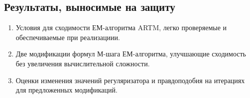 \documentclass[12pt]{article}
\begin{document}
\subsection{Результаты, выносимые на защиту}
\begin{enumerate}
\item Условия для сходимости ЕМ-алгоритма ARTM, легко проверяемые и обеспечиваемые при реализациии.
\item Две модификации формул М-шага ЕМ-алгоритма, улучшающие сходимость без увеличения вычислительной сложности.
\item Оценки изменения значений регуляризатора и правдоподобия на итерациях для предложенных модификаций.
\end{enumerate}
\newpage



\end{document}
